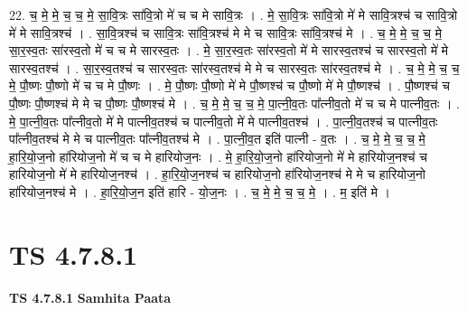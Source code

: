 \documentclass[17pt]{extarticle}
\begin{document}
22. च॒ मे॒ मे॒ च॒ च॒ मे॒ सा॒वि॒त्रः सा॑वि॒त्रो मे॑ च च मे सावि॒त्रः । . मे॒ सा॒वि॒त्रः सा॑वि॒त्रो मे॑ मे सावि॒त्रश्च॑ च सावि॒त्रो मे॑ मे सावि॒त्रश्च॑ । . सा॒वि॒त्रश्च॑ च सावि॒त्रः सा॑वि॒त्रश्च॑ मे मे च सावि॒त्रः सा॑वि॒त्रश्च॑ मे । . च॒ मे॒ मे॒ च॒ च॒ मे॒ सा॒र॒स्व॒तः सा॑रस्व॒तो मे॑ च च मे सारस्व॒तः । . मे॒ सा॒र॒स्व॒तः सा॑रस्व॒तो मे॑ मे सारस्व॒तश्च॑ च सारस्व॒तो मे॑ मे सारस्व॒तश्च॑ । . सा॒र॒स्व॒तश्च॑ च सारस्व॒तः सा॑रस्व॒तश्च॑ मे मे च सारस्व॒तः सा॑रस्व॒तश्च॑ मे । . च॒ मे॒ मे॒ च॒ च॒ मे॒ पौ॒ष्णः पौ॒ष्णो मे॑ च च मे पौ॒ष्णः । . मे॒ पौ॒ष्णः पौ॒ष्णो मे॑ मे पौ॒ष्णश्च॑ च पौ॒ष्णो मे॑ मे पौ॒ष्णश्च॑ । . पौ॒ष्णश्च॑ च पौ॒ष्णः पौ॒ष्णश्च॑ मे मे च पौ॒ष्णः पौ॒ष्णश्च॑ मे । . च॒ मे॒ मे॒ च॒ च॒ मे॒ पा॒त्नी॒व॒तः पा᳚त्नीव॒तो मे॑ च च मे पात्नीव॒तः । . मे॒ पा॒त्नी॒व॒तः पा᳚त्नीव॒तो मे॑ मे पात्नीव॒तश्च॑ च पात्नीव॒तो मे॑ मे पात्नीव॒तश्च॑ । . पा॒त्नी॒व॒तश्च॑ च पात्नीव॒तः पा᳚त्नीव॒तश्च॑ मे मे च पात्नीव॒तः पा᳚त्नीव॒तश्च॑ मे । . पा॒त्नी॒व॒त इति॑ पात्नी - व॒तः । . च॒ मे॒ मे॒ च॒ च॒ मे॒ हा॒रि॒यो॒ज॒नो हा॑रियोज॒नो मे॑ च च मे हारियोज॒नः । . मे॒ हा॒रि॒यो॒ज॒नो हा॑रियोज॒नो मे॑ मे हारियोज॒नश्च॑ च हारियोज॒नो मे॑ मे हारियोज॒नश्च॑ । . हा॒रि॒यो॒ज॒नश्च॑ च हारियोज॒नो हा॑रियोज॒नश्च॑ मे मे च हारियोज॒नो हा॑रियोज॒नश्च॑ मे । . हा॒रि॒यो॒ज॒न इति॑ हारि - यो॒ज॒नः । . च॒ मे॒ मे॒ च॒ च॒ मे॒ । . म॒ इति॑ मे । \newline
\pagebreak
{}

\section{ TS 4.7.8.1 }

\textbf{TS 4.7.8.1 } \newline
\textbf{Samhita Paata} \newline
\end{document}

